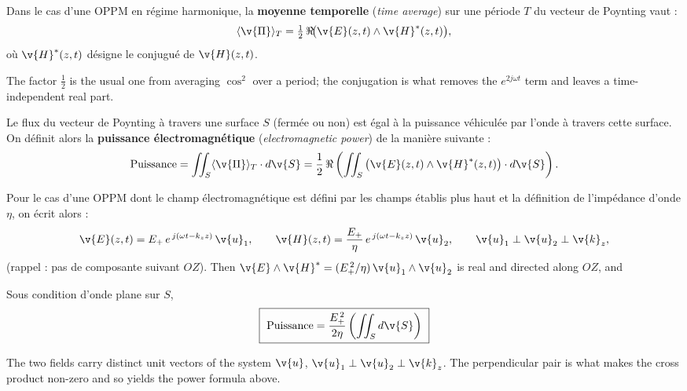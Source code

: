 \begin{prop}
  Dans le cas d'une OPPM en régime harmonique, la \textbf{moyenne temporelle}
  (\textit{time average}) sur une période $T$ du vecteur de Poynting vaut :
  \[
    \langle \v{\Pi} \rangle_T
      = \tfrac{1}{2}\,\Re\!\big(\v{E}(z,t) \wedge \v{H}^{*}(z,t)\big),
  \]
  où $\v{H}^{*}(z,t)$ désigne le conjugué de $\v{H}(z,t)$.
\end{prop}

The factor $\tfrac{1}{2}$ is the usual one from averaging $\cos^2$ over a
period; the conjugation is what removes the $e^{2j\omega t}$ term and leaves a
time-independent real part.

\begin{theorem}
  Le flux du vecteur de Poynting à travers une surface $S$ (fermée ou non) est
  égal à la puissance véhiculée par l'onde à travers cette surface. On définit
  alors la \textbf{puissance électromagnétique} (\textit{electromagnetic power})
  de la manière suivante :
  \[
    \text{Puissance} = \iint_S \langle \v{\Pi} \rangle_T \cdot d\v{S}
      = \frac{1}{2}\,\Re\left(
          \iint_S \big(\v{E}(z,t) \wedge \v{H}^{*}(z,t)\big)\cdot d\v{S}
        \right).
  \]
\end{theorem}

Pour le cas d'une OPPM dont le champ électromagnétique est défini par les
champs établis plus haut et la définition de l'impédance d'onde $\eta$, on
écrit alors :
\[
  \v{E}(z,t) = E_+\,e^{\,j(\omega t - k_z z)}\,\v{u}_1,
  \qquad
  \v{H}(z,t) = \frac{E_+}{\eta}\,e^{\,j(\omega t - k_z z)}\,\v{u}_2,
  \qquad
  \v{u}_1 \perp \v{u}_2 \perp \v{k}_z,
\]
(rappel : pas de composante suivant $OZ$). Then
$\v{E}\wedge\v{H}^{*} = (E_+^{\,2}/\eta)\,\v{u}_1\wedge\v{u}_2$ is real and
directed along $OZ$, and

\begin{conclusion}
  Sous condition d'onde plane sur $S$,
  \[
    \boxed{\ \text{Puissance} = \frac{E_+^{\,2}}{2\eta}\left(\iint_S d\v{S}\right)\ }
  \]
\end{conclusion}

\begin{remark}
  The two fields carry distinct unit vectors of the system $\v{u}$,
  $\v{u}_1 \perp \v{u}_2 \perp \v{k}_z$. The perpendicular pair is what makes
  the cross product non-zero and so yields the power formula above.
\end{remark}

